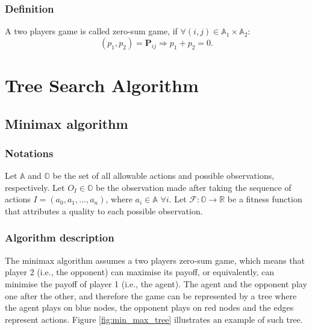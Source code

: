 \documentclass[11pt,fleqn]{book} %
\begin{document}
\subsection*{Definition}

A two players game is called zero-sum game, if $\forall (i, j) \in \mathbb{A}_1 \times \mathbb{A}_2$:
$$(p_1,p_2) = \bm{P}_{ij} \Rightarrow p_1 + p_2 = 0.$$


\chapter{Tree Search Algorithm}

\section{Minimax algorithm} \label{sec:minmax}

\subsection*{Notations}

Let $\mathbb{A}$ and $\mathbb{O}$ be the set of all allowable actions and possible observations, respectively. Let $O_I \in \mathbb{O}$ be the observation made after taking the sequence of actions $I = (a_0, a_1, ..., a_n)$, where $a_i \in \mathbb{A} \,\, \forall i$. Let $\mathcal{F} : \mathbb{O} \rightarrow \mathbb{R}$ be a fitness function that attributes a quality to each possible observation.

\subsection*{Algorithm description}

The minimax algorithm assumes a two players zero-sum game, which means that player 2 (i.e., the opponent) can maximise its payoff, or equivalently, can minimise the payoff of player 1 (i.e., the agent). The agent and the opponent play one after the other, and therefore the game can be represented by a tree where the agent plays on blue nodes, the opponent plays on red nodes and the edges represent actions. Figure \ref{fig:min_max_tree} illustrates an example of such tree.
\end{document}
